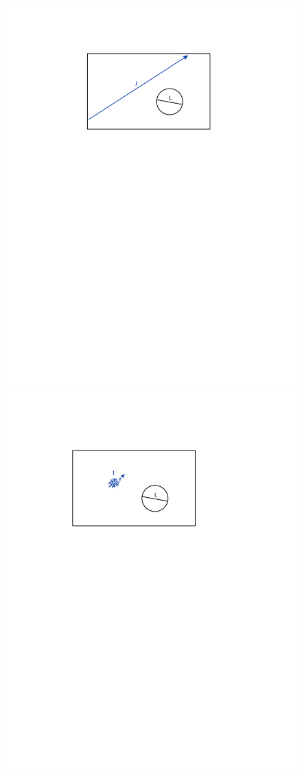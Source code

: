 \begin{figure}[h!]
\begin{center}
\includegraphics[scale=0.6]{figures/Large_Kn.pdf}
\includegraphics[scale=0.6]{figures/Small_Kn.pdf}

\end{center}
\end{figure}
